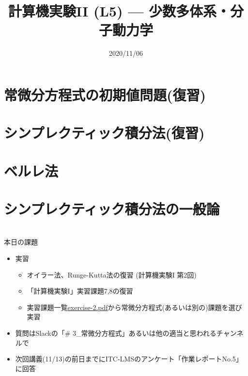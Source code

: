 \documentclass[10pt,dvipdfmx]{beamer}
\title{計算機実験II (L5) --- 少数多体系・分子動力学}
\date{2020/11/06}
\begin{document}
\begin{frame}
  \titlepage
  \tableofcontents
\end{frame}



\section{常微分方程式の初期値問題(復習)}





\section{シンプレクティック積分法(復習)}





\section{ベルレ法}




\section{シンプレクティック積分法の一般論}






\section{}
\begin{frame}[t]{本日の課題}
  \begin{itemize}
  \item 実習
    \begin{itemize}
    \item オイラー法、Runge-Kutta法の復習 (計算機実験I 第2回)
    \item 「計算機実験I」実習課題7,8の復習
    \item 実習課題一覧\href{https://github.com/todo-group/ComputerExperiments/releases/tag/2020a-computer2}{exercise-2.pdf}から常微分方程式(あるいは別の)課題を選び実習
    \end{itemize}
  \item 質問はSlackの「\# 3\_常微分方程式」あるいは他の適当と思われるチャンネルで
  \item 次回講義(11/13)の前日までにITC-LMSのアンケート「作業レポートNo.5」に回答
  \end{itemize}
\end{frame}
\end{document}
